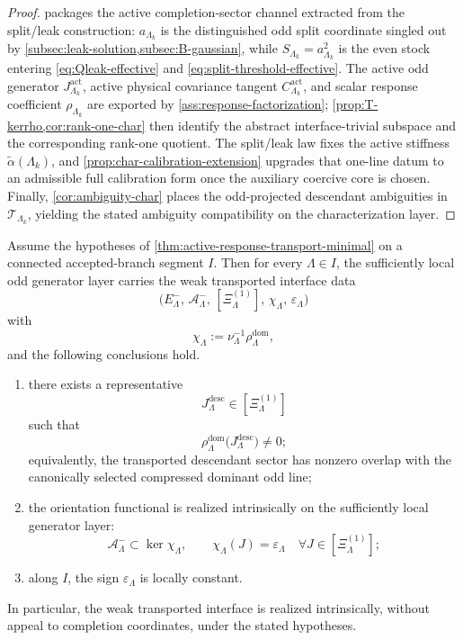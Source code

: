 \documentclass[11pt]{article}
\begin{document}
\begin{proof}
 packages the active completion-sector channel extracted from the split/leak
construction: \(a_{\Lambda_k}\) is the distinguished odd split coordinate singled out by
\cref{subsec:leak-solution,subsec:B-gaussian}, while \(S_{\Lambda_k}=a_{\Lambda_k}^2\) is the even
stock entering \eqref{eq:Qleak-effective} and \eqref{eq:split-threshold-effective}. The active odd
generator \(J^{\mathrm{act}}_{\Lambda_k}\), active physical covariance tangent
\(C^{\mathrm{act}}_{\Lambda_k}\), and scalar response coefficient \(\rho_{\Lambda_k}\) are
exported by \cref{ass:response-factorization}; \cref{prop:T-kerrho,cor:rank-one-char} then identify
the abstract interface-trivial subspace and the corresponding rank-one quotient.
The split/leak law fixes the active stiffness \(\widetilde\alpha(\Lambda_k)\), and
\cref{prop:char-calibration-extension} upgrades that one-line datum to an admissible full
calibration form once the auxiliary coercive core is chosen.
Finally, \cref{cor:ambiguity-char} places the odd-projected descendant ambiguities in
\(\mathcal T_{\Lambda_k}\), yielding the stated ambiguity compatibility on the characterization
layer.
\end{proof}

\begin{theorem}
\label{thm:char-weak-interface}
Assume the hypotheses of \cref{thm:active-response-transport-minimal} on a connected accepted-branch
segment \(I\).
Then for every \(\Lambda\in I\), the sufficiently local odd generator layer carries the weak
transported interface data
\[
\big(
E^-_{\Lambda},\,
\mathcal A^-_{\Lambda},\,
[\Xi^{(1)}_{\Lambda}],\,
\chi_{\Lambda},\,
\varepsilon_{\Lambda}
\big)
\]
with
\[
\chi_{\Lambda}
:=
\nu_{\Lambda}^{-1}\rho^{\mathrm{dom}}_{\Lambda},
\]
and the following conclusions hold.
\begin{enumerate}[leftmargin=2em]
\item there exists a representative
  \[
  J^{\mathrm{desc}}_{\Lambda}\in[\Xi^{(1)}_{\Lambda}]
  \]
  such that
  \[
  \rho^{\mathrm{dom}}_{\Lambda}\!\big(J^{\mathrm{desc}}_{\Lambda}\big)\neq 0;
  \]
  equivalently, the transported descendant sector has nonzero overlap with the canonically selected
  compressed dominant odd line;
\item the orientation functional is realized intrinsically on the sufficiently local generator layer:
  \[
  \mathcal A^-_{\Lambda}\subset\ker\chi_{\Lambda},
  \qquad
  \chi_{\Lambda}(J)=\varepsilon_{\Lambda}
  \quad
  \forall J\in[\Xi^{(1)}_{\Lambda}];
  \]
\item along \(I\), the sign \(\varepsilon_{\Lambda}\) is locally constant.
\end{enumerate}
In particular, the weak transported interface is realized intrinsically, without appeal to completion
coordinates, under the stated hypotheses.
\end{theorem}
\end{document}
